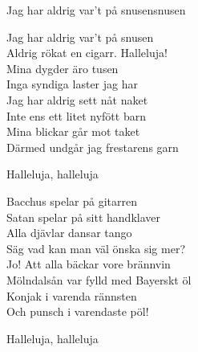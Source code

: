 \begin{song}{Jag har aldrig var't på snusen}{snusen}
\begin{vers}
Jag har aldrig var't på snusen\\
Aldrig rökat en cigarr. Halleluja!\\
Mina dygder äro tusen\\
Inga syndiga laster jag har\\
Jag har aldrig sett nåt naket\\
Inte ens ett litet nyfött barn\\
Mina blickar går mot taket\\
Därmed undgår jag frestarens garn\\
\end{vers}
\begin{vers}
\repopen Halleluja, halleluja \repclose\\
\end{vers}
\begin{vers}
Bacchus spelar på gitarren\\
Satan spelar på sitt handklaver\\
Alla djävlar dansar tango\\
Säg vad kan man väl önska sig mer?\\
Jo! Att alla bäckar vore brännvin\\
Mölndalsån var fylld med Bayerskt öl\\
Konjak i varenda rännsten\\
Och punsch i varendaste pöl!\\
\end{vers}
\begin{vers}
\repopen Halleluja, halleluja \repclose\\
\end{vers}
\end{song}
